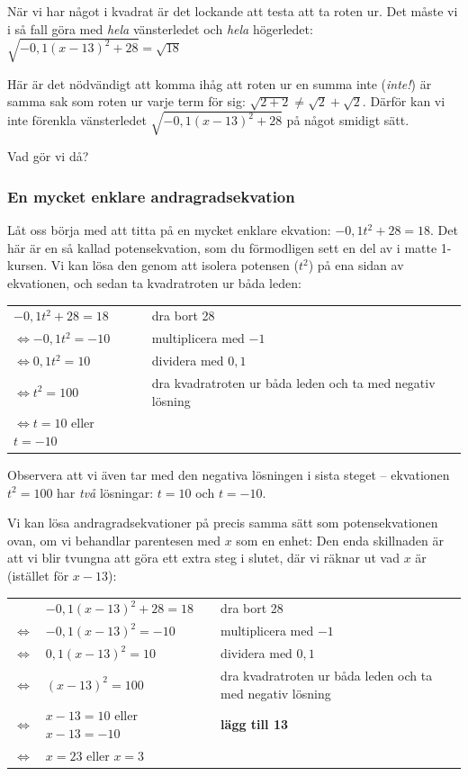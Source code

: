 När vi har något i kvadrat är det lockande att testa att ta roten ur.
Det måste vi i så fall göra med \emph{hela} vänsterledet och \emph{hela} högerledet:
$\sqrt{-0,1(x-13)^2+28}=\sqrt{18}$

Här är det nödvändigt att komma ihåg att roten ur en summa inte (\emph{inte!}) är samma sak som roten ur varje term för sig:
$\sqrt{2+2} \neq \sqrt{2} + \sqrt{2}$.
Därför kan vi inte förenkla vänsterledet $\sqrt{-0,1(x-13)^2+28}$ på något smidigt sätt.

Vad gör vi då?

\subsubsection{En mycket enklare andragradsekvation}

Låt oss börja med att titta på en mycket enklare ekvation: $-0,1t^2+28=18$.
Det här är en så kallad potensekvation, som du förmodligen sett en del av i matte 1-kursen.
Vi kan lösa den genom att isolera potensen ($t^2$) på ena sidan av ekvationen, och sedan ta kvadratroten ur båda leden:

\smallskip
\begin{tabular}{l|p{4.7cm}}
  $-0,1t^2+28=18$ & dra bort 28 \\
  $\Leftrightarrow -0,1t^2=-10$ & multiplicera med $-1$ \\
  $\Leftrightarrow 0,1t^2=10$ & dividera med $0{,}1$ \\
  $\Leftrightarrow t^2=100$ & dra kvadratroten ur båda leden och ta med negativ lösning \\
  $\Leftrightarrow t=10$ eller $t=-10$
\end{tabular}
\smallskip

Observera att vi även tar med den negativa lösningen i sista steget -- ekvationen $t^2=100$ har \emph{två} lösningar: $t=10$ och $t=-10$.

Vi kan lösa andragradsekvationer på precis samma sätt som potensekvationen ovan, om vi behandlar parentesen med $x$ som en enhet:
Den enda skillnaden är att vi blir tvungna att göra ett extra steg i slutet, där vi räknar ut vad $x$ är (istället för $x-13$):

\smallskip
\begin{tabular}{r p{5cm}|p{4.7cm}}
  & $-0,1(x-13)^2+28=18$ & dra bort 28 \\
  $\Leftrightarrow$ & $-0,1(x-13)^2=-10$ & multiplicera med $-1$ \\
  $\Leftrightarrow$ & $0,1(x-13)^2=10$ & dividera med $0,1$ \\
  $\Leftrightarrow$ & $(x-13)^2=100$ & dra kvadratroten ur båda leden och ta med negativ lösning \\
  $\Leftrightarrow$ & $x-13=10$ eller $x-13=-10$ & \textbf{lägg till 13} \\
  $\Leftrightarrow$ & $x = 23$ eller $x=3$  
\end{tabular}
\smallskip

